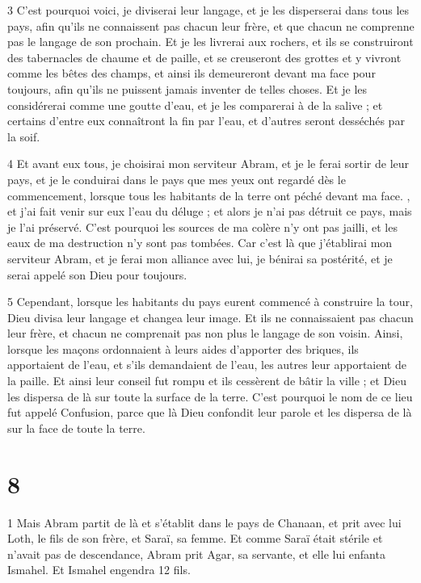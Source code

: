 \par 3 C'est pourquoi voici, je diviserai leur langage, et je les disperserai dans tous les pays, afin qu'ils ne connaissent pas chacun leur frère, et que chacun ne comprenne pas le langage de son prochain. Et je les livrerai aux rochers, et ils se construiront des tabernacles de chaume et de paille, et se creuseront des grottes et y vivront comme les bêtes des champs, et ainsi ils demeureront devant ma face pour toujours, afin qu'ils ne puissent jamais inventer de telles choses. Et je les considérerai comme une goutte d'eau, et je les comparerai à de la salive ; et certains d'entre eux connaîtront la fin par l'eau, et d'autres seront desséchés par la soif.

\par 4 Et avant eux tous, je choisirai mon serviteur Abram, et je le ferai sortir de leur pays, et je le conduirai dans le pays que mes yeux ont regardé dès le commencement, lorsque tous les habitants de la terre ont péché devant ma face. , et j'ai fait venir sur eux l'eau du déluge ; et alors je n'ai pas détruit ce pays, mais je l'ai préservé. C'est pourquoi les sources de ma colère n'y ont pas jailli, et les eaux de ma destruction n'y sont pas tombées. Car c'est là que j'établirai mon serviteur Abram, et je ferai mon alliance avec lui, je bénirai sa postérité, et je serai appelé son Dieu pour toujours.

\par 5 Cependant, lorsque les habitants du pays eurent commencé à construire la tour, Dieu divisa leur langage et changea leur image. Et ils ne connaissaient pas chacun leur frère, et chacun ne comprenait pas non plus le langage de son voisin. Ainsi, lorsque les maçons ordonnaient à leurs aides d'apporter des briques, ils apportaient de l'eau, et s'ils demandaient de l'eau, les autres leur apportaient de la paille. Et ainsi leur conseil fut rompu et ils cessèrent de bâtir la ville ; et Dieu les dispersa de là sur toute la surface de la terre. C'est pourquoi le nom de ce lieu fut appelé Confusion, parce que là Dieu confondit leur parole et les dispersa de là sur la face de toute la terre.

\chapter{8}

\par 1 Mais Abram partit de là et s'établit dans le pays de Chanaan, et prit avec lui Loth, le fils de son frère, et Saraï, sa femme. Et comme Saraï était stérile et n'avait pas de descendance, Abram prit Agar, sa servante, et elle lui enfanta Ismahel. Et Ismahel engendra 12 fils.

